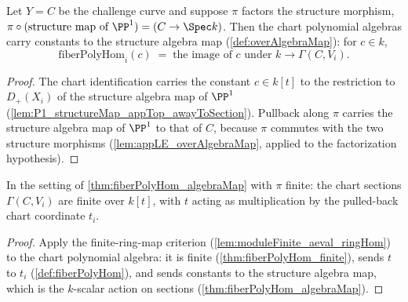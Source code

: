 \begin{theorem}
  \label{thm:fiberPolyHom_algebraMap}
  \leanok
  Let \(Y = C\) be the challenge curve and suppose \(\pi\) factors the structure
  morphism, \(\pi \circ (\text{structure map of } \PP^1) = (C \to \Spec k)\). Then the
  chart polynomial algebras carry constants to the structure algebra map
  (\ref{def:overAlgebraMap}): for \(c \in k\),
  \[
    \text{fiberPolyHom}_i(c) \;=\; \text{the image of } c \text{ under }
      k \to \Gamma(C, V_i).
  \]
\end{theorem}
\begin{proof}
  \leanok
  The chart identification carries the constant \(c \in k[t]\) to the restriction to
  \(D_+(X_i)\) of the structure algebra map of \(\PP^1\)
  (\ref{lem:P1_structureMap_appTop_awayToSection}). Pullback along \(\pi\) carries the
  structure algebra map of \(\PP^1\) to that of \(C\), because \(\pi\) commutes with
  the two structure morphisms (\ref{lem:appLE_overAlgebraMap}, applied to the
  factorization hypothesis).
\end{proof}

\begin{theorem}
  \label{thm:moduleFinite_aeval_fiberCoord}
  \leanok
  In the setting of \ref{thm:fiberPolyHom_algebraMap} with \(\pi\) finite: the chart
  sections \(\Gamma(C, V_i)\) are finite over \(k[t]\), with \(t\) acting as
  multiplication by the pulled-back chart coordinate \(t_i\).
\end{theorem}
\begin{proof}
  \leanok
  Apply the finite-ring-map criterion (\ref{lem:moduleFinite_aeval_ringHom}) to the
  chart polynomial algebra: it is finite (\ref{thm:fiberPolyHom_finite}), sends \(t\)
  to \(t_i\) (\ref{def:fiberPolyHom}), and sends constants to the structure algebra
  map, which is the \(k\)-scalar action on sections
  (\ref{thm:fiberPolyHom_algebraMap}).
\end{proof}

